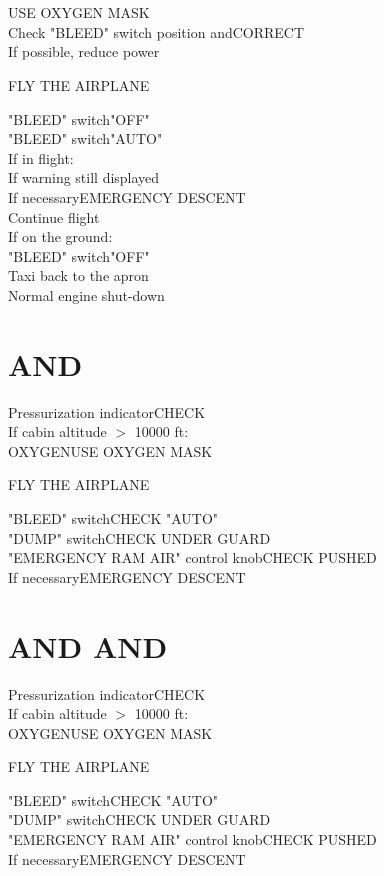 \documentclass{article}
\newcommand{\fly}{\vspace{-1em}\begin{center}\color{Green}FLY THE AIRPLANE\end{center}\vspace{-1em}}
\newcommand{\warning}[1]{\colorbox{Black}{\color{Orange}{#1}}}
\newcommand{\caution}[1]{\colorbox{Black}{\color{Red}{#1}}}
\begin{document}
\begin{multicols*}{2}
\section*{\color{Orange}{BLEED OFF}}
USE OXYGEN MASK\\
Check "BLEED" switch position and\dotfill CORRECT\\
\vspace{-1em}
If possible, reduce power\\
\fly
"BLEED" switch\dotfill "OFF"\\
"BLEED" switch\dotfill "AUTO"\\
If in flight:\\
\hspace*{6mm} If warning \warning{BLEED OFF} still displayed\\
\hspace*{6mm} If necessary\dotfill EMERGENCY DESCENT\\
\hspace*{6mm} Continue flight\\
If on the ground:\\
\hspace*{6mm} "BLEED" switch\dotfill "OFF"\\
\hspace*{6mm} Taxi back to the apron\\
\hspace*{6mm} Normal engine shut-down
\section*{\color{Red}{CABIN ALTITUDE} AND \warning{USE OXYGEN MASK}}
Pressurization indicator\dotfill CHECK\\
If cabin altitude $>$ 10000 ft:\\
\vspace{-1em}
OXYGEN\dotfill  USE OXYGEN MASK\\
\fly
"BLEED" switch\dotfill CHECK "AUTO"\\
"DUMP" switch\dotfill CHECK UNDER GUARD\\
"EMERGENCY RAM AIR" control knob\dotfill CHECK PUSHED\\
If necessary\dotfill EMERGENCY DESCENT\\
\section*{\color{Red}{CABIN ALTITUDE} AND \warning{USE OXYGEN MASK} AND \caution{EDM}}
Pressurization indicator\dotfill CHECK\\
If cabin altitude $>$ 10000 ft:\\
\vspace{-.8em}
OXYGEN\dotfill  USE OXYGEN MASK\\
\fly
\vspace{.2em}
"BLEED" switch\dotfill CHECK "AUTO"\\
"DUMP" switch\dotfill CHECK UNDER GUARD\\
"EMERGENCY RAM AIR" control knob\dotfill CHECK PUSHED\\
If necessary\dotfill EMERGENCY DESCENT\\

\end{multicols*}
\end{document}
